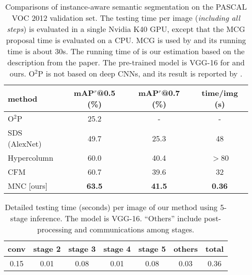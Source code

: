 \documentclass[10pt,twocolumn,letterpaper]{article}
\begin{document}
\setlength{\tabcolsep}{2pt}
\renewcommand{\arraystretch}{1.05}
\begin{table}[t]
\begin{center}
\small
\begin{tabular}{l|c|c|c}
method &\footnotesize mAP$^{r}$@0.5 (\%) &\footnotesize mAP$^{r}$@0.7 (\%) &\footnotesize time/img (s) \\
\hline
O$^2$P \cite{Carreira2012} & 25.2 & - & - \\
SDS (AlexNet) \cite{Hariharan2014} & 49.7 & 25.3 & 48 \\
Hypercolumn \cite{Hariharan2015} & 60.0 & 40.4 & $>$80 \\
CFM \cite{Dai2015} & 60.7 & 39.6 & 32 \\
\hline
MNC [ours] & \textbf{63.5} & \textbf{41.5} & \textbf{0.36} \\
\end{tabular}	
\end{center}
\vspace{-.5em}
\caption{Comparisons of instance-aware semantic segmentation on the PASCAL VOC 2012 validation set. The testing time per image (\emph{including all steps}) is evaluated in a single Nvidia K40 GPU, except that the MCG \cite{Arbelaez2014} proposal time is evaluated on a CPU. MCG is used by \cite{Hariharan2014,Hariharan2015,Dai2015} and its running time is about 30s. The running time of \cite{Hariharan2015} is our estimation based on the description from the paper.
The pre-trained model is VGG-16 for \cite{Hariharan2015,Dai2015} and ours. O$^2$P is not based on deep CNNs, and its result is reported by \cite{Hariharan2014}.}
\label{tab:voc_result}
\end{table}

\setlength{\tabcolsep}{6pt}
\renewcommand{\arraystretch}{1.05}
\begin{table}[t]
\begin{center}
\small
\begin{tabular}{cccccc|c}
conv & stage 2 & stage 3 & stage 4 & stage 5 & others & total \\
\hline
0.15 & 0.01 & 0.08 & 0.01 & 0.08 & 0.03 & 0.36 \\
\end{tabular}	
\end{center}
\vspace{-1em}
\caption{Detailed testing time (seconds) per image of our method using 5-stage inference. The model is VGG-16. ``Others'' include post-processing and communications among stages.}
\label{tab:time}
\end{table}
\end{document}
